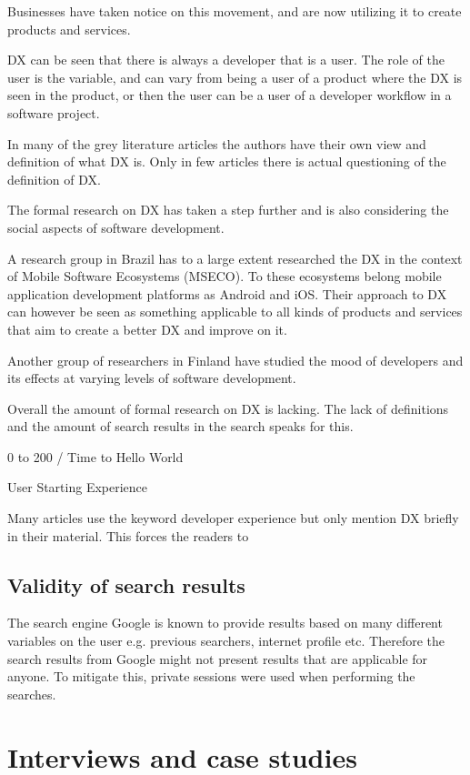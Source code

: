\documentclass[english, 12pt, a4paper, sci, utf8, a-1b, online]{aaltothesis}
\begin{document}
Businesses have taken notice on this movement, and are now utilizing it to create products and services.

DX can be seen that there is always a developer that is a user. The role of the user is the variable, and can vary from being a user of a product where the DX is seen in the product, or then the user can be a user of a developer workflow in a software project.  

In many of the grey literature articles the authors have their own view and definition of what DX is. Only in few articles there is actual questioning of the definition of DX. 

The formal research on DX has taken a step further and is also considering the social aspects of software development.

A research group in Brazil has to a large extent researched the DX in the context of Mobile Software Ecosystems (MSECO). To these ecosystems belong mobile application development platforms as Android and iOS. Their approach to DX can however be seen as something applicable to all kinds of products and services that aim to create a better DX and improve on it. 

Another group of researchers in Finland have studied the mood of developers and its effects at varying levels of software development. 

Overall the amount of formal research on DX is lacking. The lack of definitions and the amount of search results in the search speaks for this.

0 to 200 / Time to Hello World

User Starting Experience

Many articles use the keyword developer experience but only mention DX briefly in their material. This forces the readers to

\subsection{Validity of search results}

The search engine Google is known to provide results based on many different variables on the user e.g. previous searchers, internet profile etc. Therefore the search results from Google might not present results that are applicable for anyone. To mitigate this, private sessions were used when performing the searches.

\clearpage
\section{Interviews and case studies}
\end{document}
